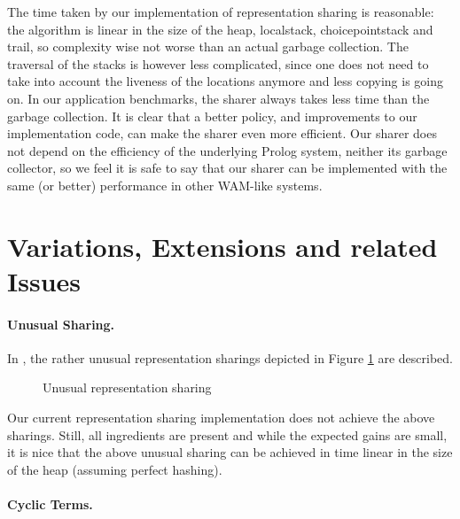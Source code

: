 \documentclass{tlp}
\begin{document}
The time taken by our implementation of representation sharing is
reasonable: the algorithm is linear in the size of the heap,
localstack, choicepointstack and trail, so complexity wise not worse
than an actual garbage collection. The traversal of the stacks is
however less complicated, since one does not need to take into account
the liveness of the locations anymore and less copying is going on.
In our application benchmarks, the sharer always takes less time than
the garbage collection. It is clear that a better policy, and
improvements to our implementation code, can make the sharer even more
efficient. Our sharer does not depend on the efficiency of the
underlying Prolog system, neither its garbage collector, so we feel it
is safe to say that our sharer can be implemented with the same (or
better) performance in other WAM-like systems.


\section{Variations, Extensions and related Issues}\label{variants}

\paragraph{\bf Unusual Sharing.}

In \cite{DemoenICLP2002fresh}, the rather unusual representation
sharings depicted in Figure \ref{fig:layout2} are described.

\begin{figure}[h]
\begin{centering}
{}
\caption{Unusual representation sharing}
\label{fig:layout2}
\end{centering}
\end{figure}


Our current representation sharing implementation does not achieve the
above sharings. Still, all ingredients are present and while the
expected gains are small, it is nice that the above unusual sharing
can be achieved in time linear in the size of the heap (assuming perfect
hashing).

\paragraph{\bf Cyclic Terms.}
\end{document}
